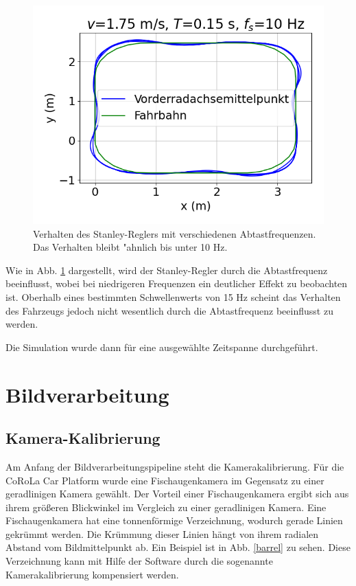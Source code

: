 \documentclass[arbeit=studie,oneside,BCOR=12mm]{ArbeitRST}
\begin{document}
\begin{figure}[h]
    \includegraphics[scale=0.47]{10Hz}
    \caption{Verhalten des Stanley-Reglers mit verschiedenen Abtastfrequenzen.
    Das Verhalten bleibt "ahnlich bis unter 10 Hz.}
    \label{sampling}
\end{figure}

Wie in Abb. \ref{sampling} dargestellt, wird der Stanley-Regler durch die Abtastfrequenz
beeinflusst, wobei bei niedrigeren Frequenzen ein deutlicher Effekt zu
beobachten ist. Oberhalb eines bestimmten Schwellenwerts von 15 Hz scheint das
Verhalten des Fahrzeugs jedoch nicht wesentlich durch die Abtastfrequenz
beeinflusst zu werden. 

Die Simulation wurde dann für eine ausgewählte Zeitspanne durchgeführt. 



\chapter{Bildverarbeitung}
\section{Kamera-Kalibrierung}

Am Anfang der Bildverarbeitungspipeline steht die Kamerakalibrierung. Für die
CoRoLa Car Platform wurde eine Fischaugenkamera im Gegensatz zu einer
geradlinigen Kamera gewählt. Der Vorteil einer Fischaugenkamera ergibt sich aus
ihrem größeren Blickwinkel im Vergleich zu einer geradlinigen Kamera. Eine
Fischaugenkamera hat eine tonnenförmige Verzeichnung,
wodurch gerade Linien gekrümmt werden. Die Krümmung dieser Linien hängt von
ihrem radialen Abstand vom Bildmittelpunkt ab. Ein Beispiel ist in Abb.
\ref{barrel} zu sehen. Diese Verzeichnung kann mit Hilfe der Software durch die
sogenannte Kamerakalibrierung kompensiert werden. \\
\end{document}
